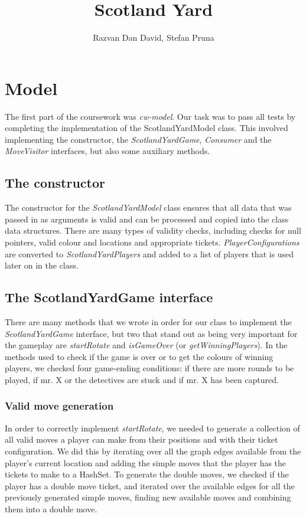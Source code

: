 \documentclass[12pt,a4paper]{scrartcl}
\begin{document}
\title{Scotland Yard}
\author{Razvan Dan David, Stefan Pruna}
\maketitle

\section{Model}
The first part of the coursework was \textit{cw-model}. Our task was to pass all tests by completing the implementation of the ScotlandYardModel class. This involved implementing the constructor, the \textit{ScotlandYardGame}, \textit{Consumer} and the \textit{MoveVisitor} interfaces, but also some auxiliary methods.

\subsection*{The constructor}
The constructor for the \textit{ScotlandYardModel} class ensures that all data that was passed in as arguments is valid and can be processed and copied into the class data structures. There are many types of validity checks, including checks for null pointers, valid colour and locations and appropriate tickets. \textit{PlayerConfigurations} are converted to \textit{ScotlandYardPlayers} and added to a list of players that is used later on in the class.

\subsection*{The ScotlandYardGame interface}
There are many methods that we wrote in order for our class to implement the \textit{ScotlandYardGame} interface, but two that stand out as being very important for the gameplay are \textit{startRotate} and \textit{isGameOver} (or \textit{getWinningPlayers}). In the methods used to check if the game is over or to get the colours of winning players, we checked four game-ending conditions: if there are more rounds to be played, if mr. X or the detectives are stuck and if mr. X has been captured.

\subsubsection*{Valid move generation} 
In order to correctly implement \textit{startRotate}, we needed to generate a collection of all valid moves a player can make from their positions and with their ticket configuration. We did this by iterating over all the graph edges available from the player's current location and adding the simple moves that the player has the tickets to make to a HashSet. To generate the double moves, we checked if the player has a double move ticket, and iterated over the available edges for all the previously generated simple moves, finding new available moves and combining them into a double move.
\end{document}
